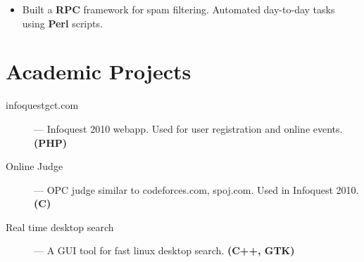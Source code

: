 \documentclass{resume}
\begin{document}
\begin{itemize} \itemsep1pt \parskip0pt
  \item Built a \textbf{RPC} framework for spam filtering.  Automated day-to-day tasks using \textbf{Perl} scripts.
\end{itemize}
 
\section{Academic Projects}
\begin{description}
  \item[infoquestgct.com] --- Infoquest 2010 webapp.  Used for user registration and online events. \textbf{(PHP)}
  \item[Online Judge] --- OPC judge similar to codeforces.com, spoj.com.  Used in Infoquest 2010. \textbf{(C)}
  \item[Real time desktop search] --- A GUI tool for fast linux desktop search.  \textbf{(C++, GTK)}
\end{description}
\end{document}
